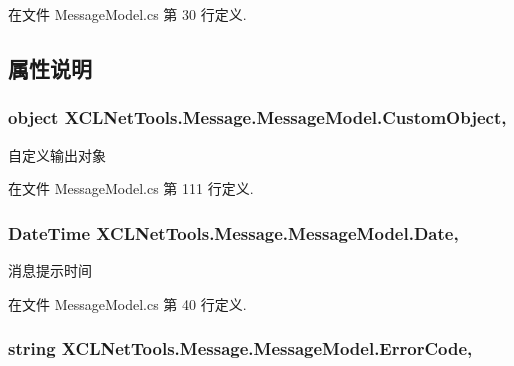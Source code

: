 在文件 Message\-Model.\-cs 第 30 行定义.



\subsection{属性说明}
\hypertarget{class_x_c_l_net_tools_1_1_message_1_1_message_model_a1f5c9fd605c8bfeb76563ccc8272510c}{
\subsubsection[{Custom\-Object}]{\setlength{\rightskip}{0pt plus 5cm}object X\-C\-L\-Net\-Tools.\-Message.\-Message\-Model.\-Custom\-Object\hspace{0.3cm}{\ttfamily [get]}, {\ttfamily [set]}}}\label{class_x_c_l_net_tools_1_1_message_1_1_message_model_a1f5c9fd605c8bfeb76563ccc8272510c}


自定义输出对象 



在文件 Message\-Model.\-cs 第 111 行定义.

\hypertarget{class_x_c_l_net_tools_1_1_message_1_1_message_model_a29a69610fff39e33d85105a5ca50dd20}{
\subsubsection[{Date}]{\setlength{\rightskip}{0pt plus 5cm}Date\-Time X\-C\-L\-Net\-Tools.\-Message.\-Message\-Model.\-Date\hspace{0.3cm}{\ttfamily [get]}, {\ttfamily [set]}}}\label{class_x_c_l_net_tools_1_1_message_1_1_message_model_a29a69610fff39e33d85105a5ca50dd20}


消息提示时间 



在文件 Message\-Model.\-cs 第 40 行定义.

\hypertarget{class_x_c_l_net_tools_1_1_message_1_1_message_model_a5c8290fdf8dd088943d6468819bc4d7c}{
\subsubsection[{Error\-Code}]{\setlength{\rightskip}{0pt plus 5cm}string X\-C\-L\-Net\-Tools.\-Message.\-Message\-Model.\-Error\-Code\hspace{0.3cm}{\ttfamily [get]}, {\ttfamily [set]}}}\label{class_x_c_l_net_tools_1_1_message_1_1_message_model_a5c8290fdf8dd088943d6468819bc4d7c}


